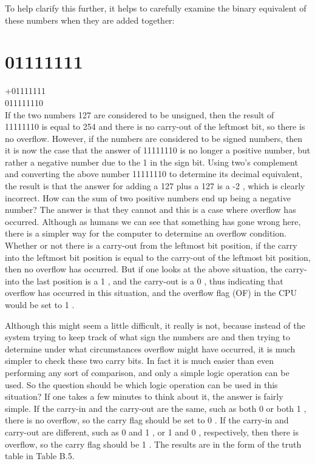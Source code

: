 \documentclass[10pt]{article}
\begin{document}
To help clarify this further, it helps to carefully examine the binary equivalent of these numbers when they are added together:

\section*{01111111}
+01111111\\
011111110\\
If the two numbers 127 are considered to be unsigned, then the result of 11111110 is equal to 254 and there is no carry-out of the leftmost bit, so there is no overflow. However, if the numbers are considered to be signed numbers, then it is now the case that the answer of 11111110 is no longer a positive number, but rather a negative number due to the 1 in the sign bit. Using two's complement and converting the above number 11111110 to determine its decimal equivalent, the result is that the answer for adding a 127 plus a 127 is a -2 , which is clearly incorrect. How can the sum of two positive numbers end up being a negative number? The answer is that they cannot and this is a case where overflow has occurred. Although as humans we can see that something has gone wrong here, there is a simpler way for the computer to determine an overflow condition. Whether or not there is a carry-out from the leftmost bit position, if the carry into the leftmost bit position is equal to the carry-out of the leftmost bit position, then no overflow has occurred. But if one looks at the above situation, the carry-into the last position is a 1 , and the carry-out is a 0 , thus indicating that overflow has occurred in this situation, and the overflow flag (OF) in the CPU would be set to 1 .

Although this might seem a little difficult, it really is not, because instead of the system trying to keep track of what sign the numbers are and then trying to determine under what circumstances overflow might have occurred, it is much simpler to check these two carry bits. In fact it is much easier than even performing any sort of comparison, and only a simple logic operation can be used. So the question should be which logic operation can be used in this situation? If one takes a few minutes to think about it, the answer is fairly simple. If the carry-in and the carry-out are the same, such as both 0 or both 1 , there is no overflow, so the carry flag should be set to 0 . If the carry-in and carry-out are different, such as 0 and 1 , or 1 and 0 , respectively, then there is overflow, so the carry flag should be 1 . The results are in the form of the truth table in Table B.5.
\end{document}
